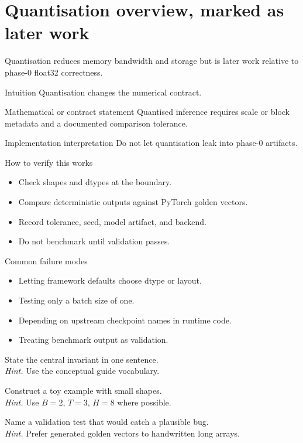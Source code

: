 \chapter{Quantisation overview, marked as later work}
\label{ch:quantisation}
Quantisation reduces memory bandwidth and storage but is later work relative to phase-0 float32 correctness.



\begin{intuitionbox}{Intuition}
Quantisation changes the numerical contract.
\end{intuitionbox}

\begin{definitionbox}{Mathematical or contract statement}
Quantised inference requires scale or block metadata and a documented comparison tolerance.
\end{definitionbox}

\begin{implementationbox}{Implementation interpretation}
Do not let quantisation leak into phase-0 artifacts.
\end{implementationbox}

\begin{verificationbox}{How to verify this works}
\begin{itemize}
\item Check shapes and dtypes at the boundary.
\item Compare deterministic outputs against PyTorch golden vectors.
\item Record tolerance, seed, model artifact, and backend.
\item Do not benchmark until validation passes.
\end{itemize}
\end{verificationbox}

\begin{warningbox}{Common failure modes}
\begin{itemize}
\item Letting framework defaults choose dtype or layout.
\item Testing only a batch size of one.
\item Depending on upstream checkpoint names in runtime code.
\item Treating benchmark output as validation.
\end{itemize}
\end{warningbox}

\begin{chapterexercises}
\item State the central invariant in one sentence.\\
\textit{Hint.} Use the conceptual guide vocabulary.
\item Construct a toy example with small shapes.\\
\textit{Hint.} Use $B=2$, $T=3$, $H=8$ where possible.
\item Name a validation test that would catch a plausible bug.\\
\textit{Hint.} Prefer generated golden vectors to handwritten long arrays.
\end{chapterexercises}
